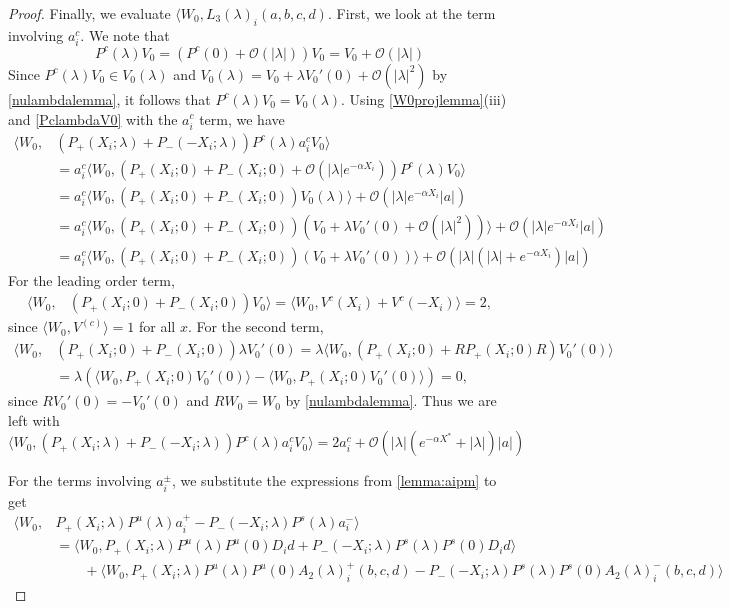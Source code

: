 \documentclass[thesis.tex]{subfiles}
\begin{document}
\begin{lemma}
\begin{proof}
Finally, we evaluate $\langle W_0, L_3(\lambda)_i(a,b,c,d)$. First, we look at the term involving $a_i^c$. We note that 
\[
P^c(\lambda) V_0 = (P^c(0) + \mathcal{O}(|\lambda|)) V_0 = V_0 + \mathcal{O}(|\lambda|)
\]
Since $P^c(\lambda) V_0 \in V_0(\lambda)$ and $V_0(\lambda) = V_0 + \lambda V_0'(0) + \mathcal{O}(|\lambda|^2)$ by \cref{nulambdalemma}, it follows that $P^c(\lambda) V_0 = V_0(\lambda)$. Using \cref{W0projlemma}(iii) and \cref{PclambdaV0} with the $a_i^c$ term, we have
\begin{align*}
\langle W_0, &(P_+(X_i; \lambda) +  P_-(-X_i; \lambda)) P^c(\lambda) a_i^c V_0 \rangle \\
&= a_i^c \langle W_0, (P_+(X_i; 0) + P_-(X_i; 0) + \mathcal{O}(|\lambda|e^{-\alpha X_i}))P^c(\lambda)V_0  \rangle \\
&= a_i^c \langle W_0, (P_+(X_i; 0) + P_-(X_i; 0))V_0(\lambda)  \rangle + \mathcal{O}(|\lambda|e^{-\alpha X_i}|a|) \\
&= a_i^c \langle W_0, (P_+(X_i; 0) + P_-(X_i; 0))(V_0 + \lambda V_0'(0) + \mathcal{O}(|\lambda|^2))  \rangle + \mathcal{O}(|\lambda|e^{-\alpha X_i}|a|) \\
&= a_i^c \langle W_0, (P_+(X_i; 0) + P_-(X_i; 0))(V_0 + \lambda V_0'(0) )  \rangle + \mathcal{O}(|\lambda|(|\lambda| + e^{-\alpha X_i})|a|)
\end{align*}
For the leading order term, 
\begin{align*}
\langle W_0, &(P_+(X_i; 0) + P_-(X_i; 0)) V_0 \rangle
= \langle W_0, V^c(X_i) + V^c(-X_i) \rangle = 2,
\end{align*}
since $\langle W_0, V^(c)\rangle = 1$ for all $x$. For the second term,
\begin{align*}
\langle W_0, &(P_+(X_i; 0) + P_-(X_i; 0)) \lambda V_0'(0) = 
\lambda \langle W_0, (P_+(X_i; 0) + R P_+(X_i; 0) R ) V_0'(0)\rangle \\
&= \lambda \left( \langle W_0, P_+(X_i; 0) V_0'(0) \rangle - \langle W_0, P_+(X_i; 0) V_0'(0) \rangle \right) = 0,
\end{align*}
since $R V_0'(0) = -V_0'(0)$ and $R W_0 = W_0$ by \cref{nulambdalemma}. Thus we are left with 
\begin{equation}\label{eqforaic}
\langle W_0, (P_+(X_i; \lambda) +  P_-(-X_i; \lambda)) P^c(\lambda) a_i^c V_0 \rangle
= 2 a_i^c + \mathcal{O}(|\lambda|( e^{-\alpha X^*} + |\lambda|)|a|)
\end{equation}

For the terms involving $a_i^\pm$, we substitute the expressions from \cref{lemma:aipm} to get
\begin{align*}
\langle W_0, &P_+(X_i; \lambda)P^u(\lambda) a_i^+ - P_-(-X_i; \lambda)P^s(\lambda) a_i^- \rangle \\
&= \langle W_0, P_+(X_i; \lambda)P^u(\lambda) P^u(0) D_i d + P_-(-X_i; \lambda)P^s(\lambda) P^s(0) D_i d \rangle \\
&\qquad+\langle W_0, P_+(X_i; \lambda)P^u(\lambda) P^u(0) A_2(\lambda)_i^+(b, c, d) - P_-(-X_i; \lambda)P^s(\lambda) P^s(0) A_2(\lambda)_i^-(b, c, d) \rangle 
\end{align*}


\end{proof}
\end{lemma}
\end{document}
